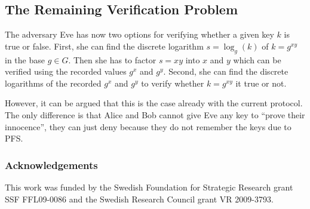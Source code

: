 \subsection{The Remaining Verification Problem}

The adversary Eve has now two options for verifying whether a given key \(k\) 
is true or false.
First, she can find the discrete logarithm \(s = \log_g( k )\) of \(k 
= g^{xy}\) in the base \(g\in G\).
Then she has to factor \(s = xy\) into \(x\) and \(y\) which can be verified 
using the recorded values \(g^x\) and \(g^y\).
Second, she can find the discrete logarithms of the recorded \(g^x\) and 
\(g^y\) to verify whether \(k = g^{xy}\) it true or not.

However, it can be argued that this is the case already with the current 
protocol.
The only difference is that Alice and Bob cannot give Eve any key to 
\enquote{prove their innocence}, they can just deny because they do not 
remember the keys due to \ac{PFS}.


\subsubsection*{Acknowledgements}

This work was funded by the Swedish Foundation for Strategic Research grant SSF 
FFL09-0086 and the Swedish Research Council grant VR 2009-3793.


\printbibliography{}
